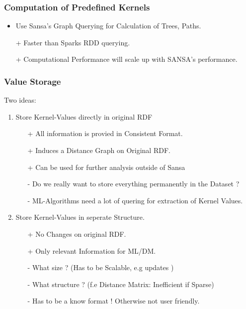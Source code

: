 \begin{frame}[fragile,t]
\frametitle{Computation of Predefined Kernels}
\begin{itemize}
\item Use Sansa's Graph Querying for Calculation of Trees, Paths.
\pause
\item[+] Faster than Sparks RDD querying. 
\pause
\item[+] Computational Performance will scale up with SANSA's performance.
\end{itemize}
\end{frame}

\begin{frame}[fragile,t]
\frametitle{Value Storage}
Two ideas:
\pause
\begin{enumerate}
\item Store Kernel-Values directly in original RDF
\begin{itemize}
	\item [+] All information is provied in Consistent Format.
	\item [+] Induces a Distance Graph on Original RDF.
	\item [+] Can be used for further analysis outside of Sansa
	\pause
	\item [-] Do we really want to store everything permanently in the Dataset ?
	\item [-] ML-Algorithms need a lot of quering for extraction of Kernel Values.
\end{itemize}
\pause
\item Store Kernel-Values in seperate Structure.
\begin{itemize}
	\item [+] No Changes on original RDF.
	\item [+] Only relevant Information for ML/DM. 
	\pause
	\item [-] What size ? (Has to be Scalable, e.g updates )
	\item [-] What structure ?  (f.e Distance Matrix: Inefficient if Sparse)
	\item [-] Has to be a know format ! Otherwise not user friendly.
\end{itemize}
\end{enumerate}
\end{frame}

